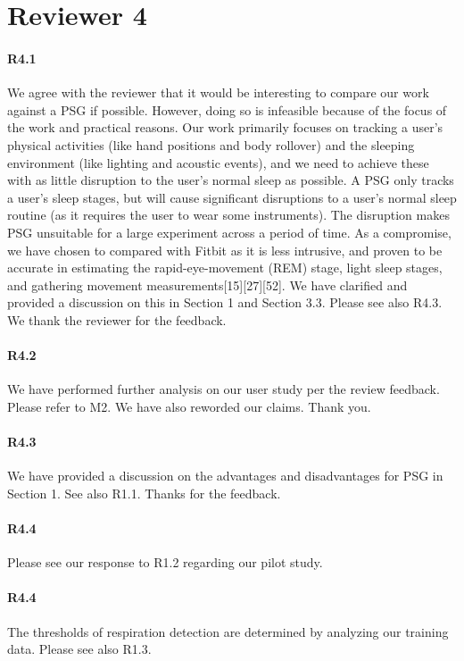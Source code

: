 \section*{Reviewer 4}

\paragraph{R4.1} We agree with the reviewer that it would be interesting to compare our work against a PSG if possible. However, doing so
is infeasible because of the focus of the work and practical reasons. Our work primarily focuses on tracking a user's physical activities
(like hand positions and body rollover) and the sleeping environment (like lighting and acoustic events), and we need to achieve these with
as little disruption to the user's normal sleep as possible. A PSG only tracks a user's sleep stages, but will cause significant
disruptions to a user's normal sleep routine (as it requires the user to wear some instruments). The disruption makes PSG unsuitable for a
large experiment across a period of time. As a compromise, we have chosen to compared with Fitbit as it is less intrusive, and proven to be
accurate in estimating the rapid-eye-movement (REM) stage, light sleep stages, and gathering movement
measurements[15][27][52]. We have clarified and provided a discussion on this in Section 1 and Section 3.3. Please see also R4.3. We
thank the reviewer for the feedback.

\paragraph{R4.2} We have performed further analysis on our user study per the review feedback. Please refer to M2. We have also reworded our
claims. Thank you. \vspace{-2mm}

\paragraph{R4.3} We have provided a discussion on the advantages and disadvantages for PSG in Section 1. See also R1.1. Thanks for the feedback.
\vspace{-2mm}
\paragraph{R4.4} Please see our response to R1.2 regarding our pilot study.
\vspace{-2mm}
\paragraph{R4.4} The thresholds of respiration detection are determined by analyzing our training data. Please
see also R1.3.
\vspace{-2mm}

